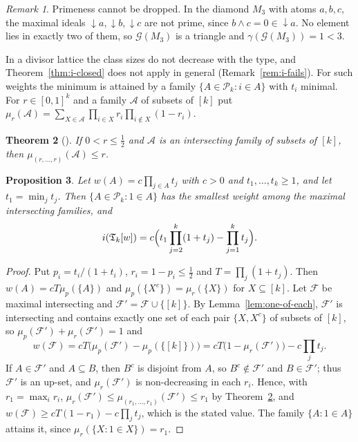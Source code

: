\documentclass[11pt]{amsart}
\newtheorem{theorem}{Theorem}[section]
\newtheorem{proposition}[theorem]{Proposition}
\theoremstyle{definition}
\theoremstyle{remark}
\newtheorem{remark}[theorem]{Remark}
\newcommand{\G}{\mathcal{G}}
\newcommand{\TG}{\mathfrak{T}}
\newcommand{\Pk}{\mathcal{P}_k}
\newcommand{\F}{\mathcal{F}}
\newcommand{\co}[1]{{#1}^{c}}
\begin{document}
\begin{remark}\label{rem:lattice-credit}
Primeness cannot be dropped. In the diamond $M_3$ with atoms $a,b,c$, the maximal ideals
${\downarrow}a,{\downarrow}b,{\downarrow}c$ are not prime, since $b\wedge c=0\in{\downarrow}a$. No
element lies in exactly two of them, so $\G(M_3)$ is a triangle and $\gamma(\G(M_3))=1<3$.
\end{remark}

In a divisor lattice the class sizes do not decrease with the type, and Theorem~\ref{thm:i-closed}
does not apply in general (Remark~\ref{rem:i-fails}). For such weights the minimum is attained by a
family $\{A\in\Pk:i\in A\}$ with $t_i$ minimal. For $r\in[0,1]^k$ and a family $\mathcal A$ of
subsets of $[k]$ put $\mu_r(\mathcal A)=\sum_{X\in\mathcal A}\prod_{i\in X}r_i\prod_{i\notin X}(1-r_i)$.

\begin{theorem}[\cite{FFFLO86,Fr08}]\label{thm:product}
If $0<r\le\frac12$ and $\mathcal A$ is an intersecting family of subsets of $[k]$, then
$\mu_{(r,\dots,r)}(\mathcal A)\le r$.
\end{theorem}

\begin{proposition}\label{prop:i-increasing}
Let $w(A)=c\prod_{j\in A}t_j$ with $c>0$ and $t_1,\dots,t_k\ge1$, and let $t_1=\min_jt_j$. Then
$\{A\in\Pk:1\in A\}$ has the smallest weight among the maximal intersecting families, and
\[
  i(\TG_k[w])=c\Bigl(t_1\prod_{j=2}^k(1+t_j)-\prod_{j=1}^kt_j\Bigr).
\]
\end{proposition}

\begin{proof}
Put $p_i=t_i/(1+t_i)$, $r_i=1-p_i\le\frac12$ and $T=\prod_j(1+t_j)$. Then $w(A)=cT\mu_p(\{A\})$ and
$\mu_p(\{\co X\})=\mu_r(\{X\})$ for $X\subseteq[k]$. Let $\F$ be maximal intersecting and
$\F'=\F\cup\{[k]\}$. By Lemma~\ref{lem:one-of-each}, $\F'$ is intersecting and contains exactly one
set of each pair $\{X,\co X\}$ of subsets of $[k]$, so $\mu_p(\F')+\mu_r(\F')=1$ and
\[
  w(\F)=cT\bigl(\mu_p(\F')-\mu_p(\{[k]\})\bigr)=cT\bigl(1-\mu_r(\F')\bigr)-c\prod_jt_j .
\]
If $A\in\F'$ and $A\subseteq B$, then $\co B$ is disjoint from $A$, so $\co B\notin\F'$ and
$B\in\F'$; thus
$\F'$ is an up-set, and $\mu_r(\F')$ is non-decreasing in each $r_i$. Hence, with $r_1=\max_ir_i$,
$\mu_r(\F')\le\mu_{(r_1,\dots,r_1)}(\F')\le r_1$ by Theorem~\ref{thm:product}, and $w(\F)\ge cT(1-r_1)-c\prod_jt_j$, which is the
stated value. The family $\{A:1\in A\}$ attains it, since $\mu_r(\{X:1\in X\})=r_1$.
\end{proof}
\end{document}
